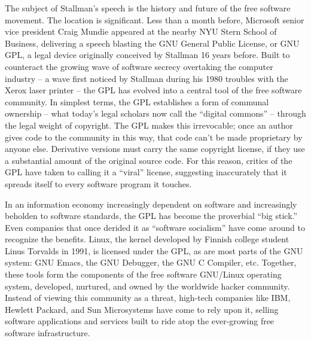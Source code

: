 The subject of Stallman's speech is the history and future of the free software movement. The location is significant. Less than a month before, Microsoft senior vice president Craig Mundie appeared at the nearby NYU Stern School of Business, delivering a speech blasting the GNU General Public License, or GNU GPL, a legal device originally conceived by Stallman 16 years before. Built to counteract the growing wave of software secrecy overtaking the computer industry -- a wave first noticed by Stallman during his 1980 troubles with the Xerox laser printer -- the GPL has evolved into a central tool of the free software community. In simplest terms, the GPL establishes a form of communal ownership -- what today's legal scholars now call the ``digital commons'' -- through the legal weight of copyright. The GPL makes this irrevocable; once an author gives code to the community in this way, that code can't be made proprietary by anyone else. Derivative versions must carry the same copyright license, if they use a substantial amount of the original source code. For this reason, critics of the GPL have taken to calling it a ``viral'' license, suggesting inaccurately that it spreads itself to every software program it touches.

In an information economy increasingly dependent on software and increasingly beholden to software standards, the GPL has become the proverbial ``big stick.'' Even companies that once derided it as ``software socialism'' have come around to recognize the benefits. Linux, the kernel developed by Finnish college student Linus Torvalds in 1991, is licensed under the GPL, as are most parts of the GNU system: GNU Emacs, the GNU Debugger, the GNU C Compiler, etc. Together, these tools form the components of the free software GNU/Linux operating system, developed, nurtured, and owned by the worldwide hacker community. Instead of viewing this community as a threat, high-tech companies like IBM, Hewlett Packard, and Sun Microsystems have come to rely upon it, selling software applications and services built to ride atop the ever-growing free software infrastructure.


